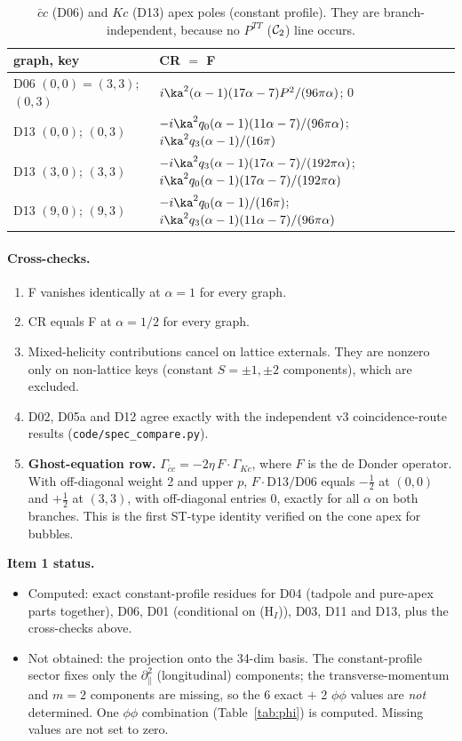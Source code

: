 \begin{table}[h]\centering\small
\begin{tabular}{ll}\toprule
graph, key & CR $=$ F\\\midrule
D06 $(0,0)=(3,3)$; $(0,3)$ & $i\ka^2(\alpha-1)(17\alpha-7)P^2/(96\pi\alpha)$; $0$\\
D13 $(0,0)$; $(0,3)$ & $-i\ka^2q_0(\alpha-1)(11\alpha-7)/(96\pi\alpha)$; $i\ka^2q_3(\alpha-1)/(16\pi)$\\
D13 $(3,0)$; $(3,3)$ & $-i\ka^2q_3(\alpha-1)(17\alpha-7)/(192\pi\alpha)$; $i\ka^2q_0(\alpha-1)(17\alpha-7)/(192\pi\alpha)$\\
D13 $(9,0)$; $(9,3)$ & $-i\ka^2q_0(\alpha-1)/(16\pi)$; $i\ka^2q_3(\alpha-1)(11\alpha-7)/(96\pi\alpha)$\\\bottomrule
\end{tabular}
\caption{$\bar cc$ (D06) and $Kc$ (D13) apex poles (constant profile). They are branch-independent, because no $P^{TT}$ ($\mathcal C_2$) line occurs.}\label{tab:gh}
\end{table}

\paragraph{Cross-checks.}
\begin{enumerate}
\item F vanishes identically at $\alpha=1$ for every graph.
\item CR equals F at $\alpha=1/2$ for every graph.
\item Mixed-helicity contributions cancel on lattice externals. They are nonzero only on non-lattice keys (constant $S=\pm1,\pm2$ components), which are excluded.
\item D02, D05a and D12 agree exactly with the independent v3 coincidence-route results (\texttt{code/spec\_compare.py}).
\item \textbf{Ghost-equation row.} $\Gamma_{\bar cc}=-2\eta\,F\cdot\Gamma_{Kc}$, where $F$ is the de Donder operator. With off-diagonal weight 2 and upper $p$, $F\cdot$D13$/$D06 equals $-\tfrac12$ at $(0,0)$ and $+\tfrac12$ at $(3,3)$, with off-diagonal entries 0, exactly for all $\alpha$ on both branches. This is the first ST-type identity verified on the cone apex for bubbles.
\end{enumerate}
\textbf{Item 1 status.}
\begin{itemize}
\item Computed: exact constant-profile residues for D04 (tadpole and pure-apex parts together), D06, D01 (conditional on (H$_I$)), D03, D11 and D13, plus the cross-checks above.
\item Not obtained: the projection onto the 34-dim basis. The constant-profile sector fixes only the $\partial_\parallel^2$ (longitudinal) components; the transverse-momentum and $m=2$ components are missing, so the 6 exact $+$ 2 $\phi\phi$ values are \emph{not} determined. One $\phi\phi$ combination (Table~\ref{tab:phi}) is computed. Missing values are not set to zero.
\end{itemize}


